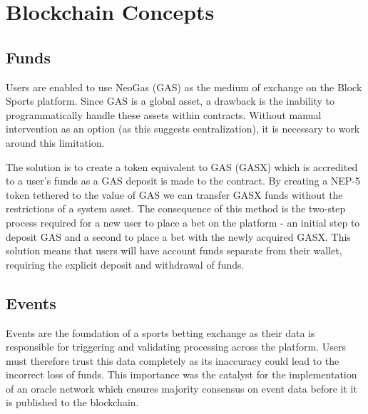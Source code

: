 \documentclass{article}
\begin{document}
\section{Blockchain Concepts} \label{blockchain-concepts}
	\subsection{Funds} \label{funds}
Users are enabled to use NeoGas (GAS) as the medium of exchange on the Block Sports platform. Since GAS is a global asset, a drawback is the inability to programmatically handle these assets within contracts. Without manual intervention as an option (as this suggests centralization), it is necessary to work around this limitation.

The solution is to create a token equivalent to GAS (GASX) which is accredited to a user’s funds as a GAS deposit is made to the contract. By creating a NEP-5 token tethered to the value of GAS we can transfer GASX funds without the restrictions of a system asset. The consequence of this method is the two-step process required for a new user to place a bet on the platform - an initial step to deposit GAS and a second to place a bet with the newly acquired GASX. This solution means that users will have account funds separate from their wallet, requiring the explicit deposit and withdrawal of funds.


	\subsection{Events} \label{events}
Events are the foundation of a sports betting exchange as their data is responsible for triggering and validating processing across the platform. Users must therefore trust this data completely as its inaccuracy could lead to the incorrect loss of funds. This importance was the catalyst for the implementation of an oracle network which ensures majority consensus on event data before it it is published to the blockchain.
\end{document}
